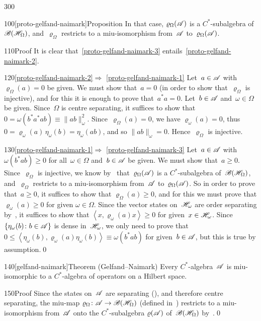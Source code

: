 \begin{parsec}{300}
\begin{point}{100}[proto-gelfand-naimark]{Proposition}
In that case, $\varrho_\Omega(\mathscr{A})$ is a $C^*$-subalgebra
of~$\mathscr{B}(\mathscr{H}_\Omega)$,
and~$\varrho_\Omega$
restricts to a miu-isomorphism from~$\mathscr{A}$ to~$\varrho_\Omega(\mathscr{A})$.
\begin{point}{110}{Proof}%
It is clear that~\ref{proto-gelfand-naimark-3}
entails~\ref{proto-gelfand-naimark-2}.
\begin{point}{120}{\ref{proto-gelfand-naimark-2}$\Longrightarrow$%
\ref{proto-gelfand-naimark-1}}%
Let~$a\in \mathscr{A}$ with $\varrho_\Omega(a)=0$ be given.
We must show that~$a=0$ (in order to show that~$\varrho_\Omega$
is injective),
and for this it is enough to prove that~$a^*a=0$.
Let~$b\in\mathscr{A}$ and~$\omega\in\Omega$ be given.
Since~$\Omega$ is centre separating,
it suffices to show that $0=\omega(b^*a^*ab) \equiv \|ab\|_\omega^2$.
Since~$\varrho_\Omega(a)=0$,
we have $\varrho_\omega(a)=0$,
thus $0=\varrho_\omega(a)\,\eta_\omega(b)
=\eta_\omega(ab)$,
and so $\|ab\|_\omega=0$.
Hence~$\varrho_\Omega$ is injective.
\end{point}
\begin{point}{130}{\ref{proto-gelfand-naimark-1}$\Longrightarrow$%
\ref{proto-gelfand-naimark-3}}%
Let~$a\in\mathscr{A}$ with $\omega(b^*a b)\geq 0$
for all~$\omega\in\Omega$ and~$b\in\mathscr{A}$
be given.
We must show that~$a\geq 0$.
Since~$\varrho_\Omega$ is injective,
we know by~
that~$\varrho_\Omega(\mathscr{A})$ is a $C^*$-subalgebra
of~$\mathscr{B}(\mathscr{H}_\Omega)$,
and~$\varrho_\Omega$ restricts to a miu-isomorphism
from~$\mathscr{A}$ to~$\varrho_\Omega(\mathscr{A})$.
So in order to prove that~$a\geq 0$,
it suffices to show that $\varrho_\Omega(a)\geq 0$,
and for this we must prove that $\varrho_\omega(a)\geq 0$
for given $\omega\in \Omega$.
Since the vector states on~$\mathscr{H}_\omega$ are order separating
by~, it suffices to show that 
$\left<x,\varrho_\omega(a)x\right>\geq 0$
for given~$x\in \mathscr{H}_\omega$.
Since~$\{\eta_\omega(b)\colon b\in\mathscr{A}\}$
is dense in~$\mathscr{H}_\omega$,
we only need to prove 
that~$0\leq \left<\eta_\omega(b),\varrho_\omega(a)\eta_\omega(b)\right>
\equiv \omega(b^*ab)$ for given~$b\in \mathscr{A}$,
but this is true
by assumption.\qed
\end{point}
\end{point}
\end{point}
\begin{point}{140}[gelfand-naimark]{Theorem (Gelfand--Naimark)}%
Every $C^*$-algebra~$\mathscr{A}$ is miu-isomorphic
to a $C^*$-algebra of operators on a Hilbert space.
\begin{point}{150}{Proof}%
Since the states on~$\mathscr{A}$
are separating
(),
and therefore centre separating,
the miu-map $\varrho_\Omega\colon \mathscr{A}\to\mathscr{B}(\mathscr{H}_\Omega)$
(defined in~)
restricts to a miu-isomorphism
from~$\mathscr{A}$ onto the $C^*$-subalgebra
$\varrho(\mathscr{A})$ of~$\mathscr{B}(\mathscr{H}_\Omega)$
by~.\qed
\end{point}
\end{point}
\end{parsec}

